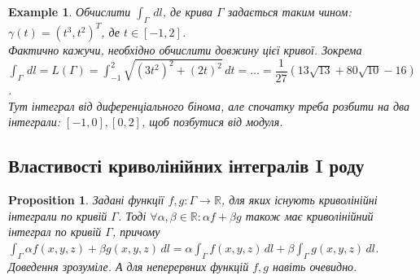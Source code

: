 \documentclass[a4paper, 10pt]{article}
\theoremstyle{theoremdd}
\theoremstyle{theoremdd}
\theoremstyle{theoremdd}
\theoremstyle{theoremdd}
\newtheorem{example}[theorem]{Example}
\theoremstyle{theoremdd}
\newtheorem{proposition}[theorem]{Proposition}
\theoremstyle{theoremdd}
\theoremstyle{theoremdd}
\theoremstyle{theoremdd}
\begin{document}
\begin{example}
Обчислити $\displaystyle\int_\Gamma \,dl$, де крива $\Gamma$ задається таким чином:\\
$\gamma(t) = (t^3,t^2)^T$, де $t \in \left[ -1,2 \right]$.\\
Фактично кажучи, необхідно обчислити довжину цієї кривої. Зокрема\\
$\displaystyle\int_\Gamma \,dl = L(\Gamma) = \int_{-1}^2 \sqrt{(3t^2)^2 + (2t)^2}\,dt = \dots = \dfrac{1}{27} ( 13\sqrt{13} + 80 \sqrt{10} - 16 )$.\\
Тут інтеграл від диференціального бінома, але спочатку треба розбити на два інтеграли: $[-1,0], [0,2]$, щоб позбутися від модуля.
\end{example}

\subsection{Властивості криволінійних інтегралів I роду}
\begin{proposition}
Задані функції $f,g: \Gamma \to \mathbb{R}$, для яких існують криволінійні інтеграли по кривій $\Gamma$. Тоді $\forall \alpha,\beta \in \mathbb{R}: \alpha f + \beta g$ також має криволінійний інтеграл по кривій $\Gamma$, причому\\
$\displaystyle\int_\Gamma \alpha f(x,y,z) + \beta g(x,y,z)\,dl = \alpha \int_\Gamma f(x,y,z)\,dl + \beta \int_\Gamma g(x,y,z)\,dl$.\\
\textit{Доведення зрозуміле. А для неперервних функцій $f,g$ навіть очевидно.}
\end{proposition}
\end{document}
